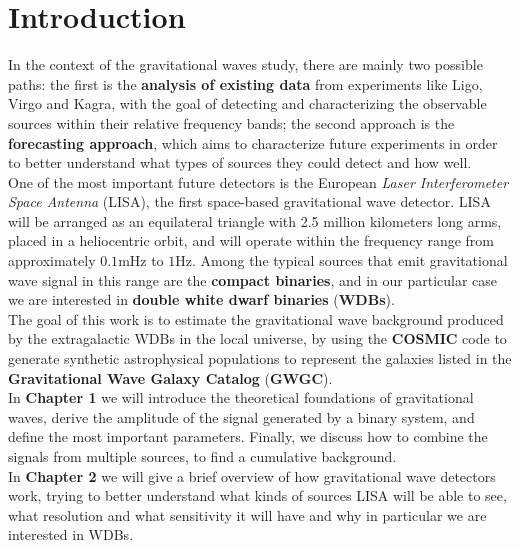 \chapter*{Introduction}
In the context of the gravitational waves study, there are mainly two possible paths: the first is the \textbf{analysis of existing data} from experiments like Ligo, Virgo and Kagra, with the goal of detecting and characterizing the observable sources within their relative frequency bands;
the second approach is the \textbf{forecasting approach}, which aims to characterize future experiments in order to better understand what types of sources they could detect and how well.
\vspace{2mm}\\
One of the most important future detectors is the European \textit{Laser Interferometer Space Antenna} (LISA), the first space-based gravitational wave detector. 
LISA will be arranged as an equilateral triangle with 2.5 million kilometers long arms, placed in a heliocentric orbit, and will operate within the frequency range from approximately $0.1\mathrm{mHz}$ to $1\mathrm{Hz}$. 
Among the typical sources that emit gravitational wave signal in this range are the \textbf{compact binaries}, and in our particular case we are interested in \textbf{double white dwarf binaries} (\textbf{WDBs}).
\vspace{2mm}\\
The goal of this work is to estimate the gravitational wave background produced by the extragalactic WDBs in the local universe, by using the \textbf{COSMIC} code to generate synthetic astrophysical populations to represent the galaxies listed in the \textbf{Gravitational Wave Galaxy Catalog} (\textbf{GWGC}).\vspace{2mm}
\\  
In \textbf{Chapter 1} we will introduce the theoretical foundations of gravitational waves, derive the amplitude of the signal generated by a binary system, and define the most important parameters. Finally, we discuss how to combine the signals from multiple sources, to find a cumulative background.\vspace{2mm}\\
In \textbf{Chapter 2} we will give a brief overview of how gravitational wave detectors work, trying to better understand what kinds of sources LISA will be able to see, what resolution and what sensitivity it will have and why in particular we are interested in WDBs. \vspace{2mm}\\
